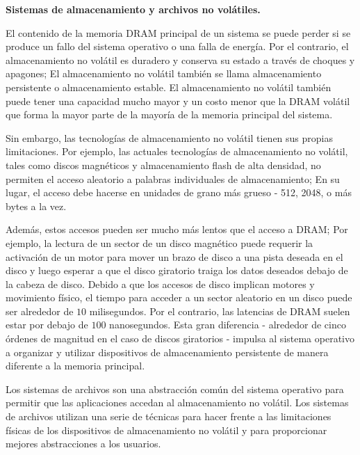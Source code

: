 \documentclass[10pt]{book}
\begin{document}
\textbf{Sistemas de almacenamiento y archivos no volátiles.}

El contenido de la memoria DRAM principal de un sistema se puede perder si se produce un fallo del sistema operativo o una falla de energía. Por el contrario, el almacenamiento no volátil es duradero y conserva su estado a través de choques y apagones; El almacenamiento no volátil también se llama almacenamiento persistente o almacenamiento estable. El almacenamiento no volátil también puede tener una capacidad mucho mayor y un costo menor que la DRAM volátil que forma la mayor parte de la mayoría de la memoria principal del sistema.

Sin embargo, las tecnologías de almacenamiento no volátil tienen sus propias limitaciones. Por ejemplo, las actuales tecnologías de almacenamiento no volátil, tales como discos magnéticos y almacenamiento flash de alta densidad, no permiten el acceso aleatorio a palabras individuales de almacenamiento; En su lugar, el acceso debe hacerse en unidades de grano más grueso - 512, 2048, o más bytes a la vez.

Además, estos accesos pueden ser mucho más lentos que el acceso a DRAM; Por ejemplo, la lectura de un sector de un disco magnético puede requerir la activación de un motor para mover un brazo de disco a una pista deseada en el disco y luego esperar a que el disco giratorio traiga los datos deseados debajo de la cabeza de disco. Debido a que los accesos de disco implican motores y movimiento físico, el tiempo para acceder a un sector aleatorio en un disco puede ser alrededor de $10$ milisegundos. Por el contrario, las latencias de DRAM suelen estar por debajo de $100$ nanosegundos. Esta gran diferencia - alrededor de cinco órdenes de magnitud en el caso de discos giratorios - impulsa al sistema operativo a organizar y utilizar dispositivos de almacenamiento persistente de manera diferente a la memoria principal.

Los sistemas de archivos son una abstracción común del sistema operativo para permitir que las aplicaciones accedan al almacenamiento no volátil. Los sistemas de archivos utilizan una serie de técnicas para hacer frente a las limitaciones físicas de los dispositivos de almacenamiento no volátil y para proporcionar mejores abstracciones a los usuarios.
\end{document}
